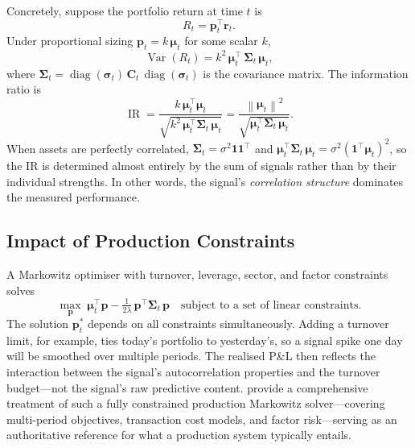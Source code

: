 \documentclass[11pt,a4paper]{article}
\newcommand{\C}{\mathbf{C}}
\newcommand{\muvec}{\bm{\mu}}
\newcommand{\norm}[1]{\left\|#1\right\|}
\begin{document}
Concretely, suppose the portfolio return at time $t$ is
\begin{equation}
  R_t = \mathbf{p}_t^\top \mathbf{r}_t.
\end{equation}
Under proportional sizing $\mathbf{p}_t = k\,\muvec_t$ for some scalar $k$,
\begin{equation}
  \operatorname{Var}(R_t) = k^2\,\muvec_t^\top \,\bm{\Sigma}_t\,\muvec_t,
\end{equation}
where $\bm{\Sigma}_t = \operatorname{diag}(\bm{\sigma}_t)\,\C_t\,
\operatorname{diag}(\bm{\sigma}_t)$ is the covariance matrix.  The
information ratio is
\begin{equation}
  \operatorname{IR} = \frac{k\,\muvec_t^\top\bm{\mu}_t}
                          {\sqrt{k^2\,\muvec_t^\top\bm{\Sigma}_t\,\muvec_t}}
                  = \frac{\norm{\muvec_t}^2}
                         {\sqrt{\muvec_t^\top\bm{\Sigma}_t\,\muvec_t}}.
\end{equation}
When assets are perfectly correlated, $\bm{\Sigma}_t = \sigma^2\mathbf{1}
\mathbf{1}^\top$ and $\muvec_t^\top\bm{\Sigma}_t\,\muvec_t = \sigma^2
(\mathbf{1}^\top\muvec_t)^2$, so the IR is determined almost entirely by the
sum of signals rather than by their individual strengths.  In other words,
the signal's \emph{correlation structure} dominates the measured performance.

\subsection{Impact of Production Constraints}

A Markowitz optimiser \citep{markowitz1952} with turnover, leverage, sector,
and factor constraints solves
\begin{equation}
  \label{eq:markowitz}
  \max_{\mathbf{p}} \;\muvec_t^\top \mathbf{p}
    - \tfrac{1}{2\lambda}\,\mathbf{p}^\top\bm{\Sigma}_t\,\mathbf{p}
  \quad \text{subject to a set of linear constraints.}
\end{equation}
The solution $\mathbf{p}^*_t$ depends on all constraints simultaneously.
Adding a turnover limit, for example, ties today's portfolio to yesterday's,
so a signal spike one day will be smoothed over multiple periods.  The
realised P\&L then reflects the interaction between the signal's
autocorrelation properties and the turnover budget---not the signal's raw
predictive content.  \citet{boyd2024} provide a comprehensive treatment of
such a fully constrained production Markowitz solver---covering multi-period
objectives, transaction cost models, and factor risk---serving as an
authoritative reference for what a production system typically entails.
\end{document}
